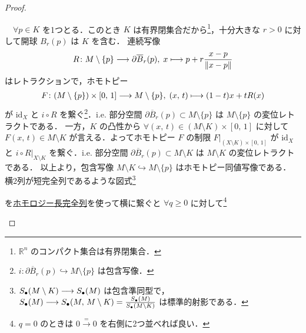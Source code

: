 \documentclass[algtopo_main]{subfiles}
\begin{document}
\begin{proof}
\begin{description}
        　$\forall p \in K$ を1つとる．このとき $K$ は有界閉集合だから\footnote{$\mathbb{R}^n$ のコンパクト集合は有界閉集合．}，十分大きな $r > 0$ に対して開球 $B_r (p)$ は $K$ を含む．
        連続写像
        \begin{align}
            R \colon M \setminus \{p\} \longrightarrow \partial \overline{B}_r(p),\; x \longmapsto p + r\frac{x-p}{\norm{x-p}}
        \end{align}
        はレトラクションで，ホモトピー
        \begin{align}
            F \colon (M \setminus \{p\}) \times [0,\, 1] \longrightarrow M \setminus \{p\},\; (x,\,t) \longmapsto (1-t)x + t R(x)
        \end{align}
        が $\mathrm{id}_X$ と $i \circ R$ を繋ぐ\footnote{$i \colon \partial \overline{B}_r (p) \hookrightarrow M \setminus \{p\}$ は包含写像．}．i.e. 部分空間 $ \partial \overline{B}_r(p) \subset M \setminus \{p\}$ は $M \setminus \{p\}$ の変位レトラクトである．
        一方，$K$ の凸性から $\forall (x,\, t) \in (M \setminus K) \times [0,\, 1]$ に対して
        $F(x,\, t) \in M \setminus K$ が言える．よってホモトピー $F$ の制限 $F|_{(X \setminus K) \times [0,\, 1]}$ が $\mathrm{id}_X$ と $i \circ R|_{X \setminus K}$ を繋ぐ．i.e. 部分空間 $ \partial \overline{B}_r(p) \subset M \setminus K$ は $M \setminus K$ の変位レトラクトである．
        以上より，包含写像 $M \setminus K \hookrightarrow M \setminus \{p\}$ はホモトピー同値写像である．
        横2列が短完全列であるような図式\footnote{$S_\bullet (M \setminus K) \longrightarrow S_\bullet (M)$ は包含準同型で，$S_\bullet (M) \longrightarrow S_\bullet (M,\, M \setminus K) = \frac{S_\bullet (M)}{S_\bullet (M \setminus K)}$ は標準的射影である．}
        \begin{center}
        \end{center}
        を\hyperref[prop:HES]{ホモロジー長完全列}を使って横に繋ぐと
        $\forall q \ge 0$ に対して\footnote{$q=0$ のときは $0 \xrightarrow{=} 0$ を右側に2つ並べれば良い．}
        \begin{center}

\end{center}
\end{description}
\end{proof}
\end{document}
